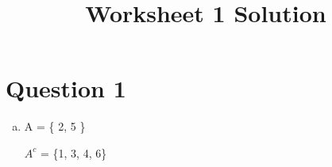 \documentclass[12pt]{article}
\begin{document}
\title{Worksheet 1 Solution}
\maketitle

\section*{Question 1}

\begin{enumerate}[a)]
    \item
        A = \{ 2, 5 \}

        $A^c$ = \{1, 3, 4, 6\}
\end{enumerate}
\end{document}
